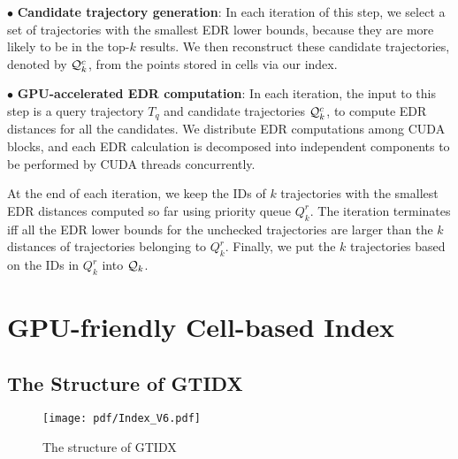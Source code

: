 \documentclass[10pt,conference,letterpaper]{IEEEtran}
\newcommand{\idxname}{GTIDX\xspace }
\newcommand{\simq}{{{\cal Q}_k}\xspace}
\newcommand{\simcand}{{{\cal Q}_k^c}\xspace}
\begin{document}
\vspace{0.1cm}$\bullet$ {\bf Candidate trajectory generation}:
In each iteration of this step, we select a set of trajectories with the smallest EDR lower bounds, because they are more likely to be in the top-$k$ results. We then reconstruct these candidate trajectories, denoted by $\simcand$, from the points stored in cells via our index.

\vspace{0.1cm}$\bullet$ {\bf GPU-accelerated EDR computation}:
In each iteration, the input to this step is a query trajectory $T_q$ and candidate trajectories $\simcand$, to compute EDR distances for all the candidates. We distribute EDR computations among CUDA blocks, and each EDR calculation is decomposed into independent components to be performed by CUDA threads concurrently.

At the end of each iteration, we keep the IDs of $k$ trajectories with the smallest EDR distances computed so far using priority queue $Q_k^r$. The iteration terminates iff all the EDR lower bounds for the unchecked trajectories are larger than the $k$ distances of trajectories belonging to $Q_{k}^r$. Finally, we put the $k$ trajectories based on the IDs in $Q_k^r$ into $\simq$.




\section{GPU-friendly Cell-based Index}\label{sec:index}


\subsection{The Structure of \idxname}

\begin{figure}[t]
	\centering
	\texttt{[image: pdf/Index\_V6.pdf]}
	\vspace{-.2in}
	\caption{The structure of \idxname \label{fig:Index}}
	\vspace{-.1in}
\end{figure}
\end{document}
